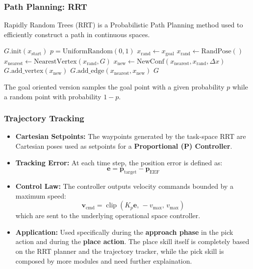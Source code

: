 \documentclass[10pt]{beamer}
\begin{document}
\begin{frame}[fragile]
    \frametitle{Path Planning: RRT}
    Rapidly Random Trees (RRT) is a Probabilistic Path Planning method used to efficiently construct a path in continuous spaces.
    \begin{algorithm}[H]
        \captionsetup{font=scriptsize}
        \scriptsize
        \caption{Goal Oriented RRT Algorithm}
        \begin{algorithmic}[1]
            \State $G.\text{init}(x_{\text{start}})$
                \State $p = \text{UniformRandom}(0, 1)$ 
                    \State $x_{\text{rand}} \gets x_{\text{goal}}$
                \Else
                    \State $x_{\text{rand}} \gets \text{RandPose}()$
                \EndIf
                \State $x_{\text{nearest}} \gets \text{NearestVertex}(x_{\text{rand}}, G)$
                \State $x_{\text{new}} \gets \text{NewConf}(x_{\text{nearest}}, x_{\text{rand}}, \Delta x)$
                    \State $G.\text{add\_vertex}(x_{\text{new}})$
                    \State $G.\text{add\_edge}(x_{\text{nearest}}, x_{\text{new}})$
                        \Return {}
                    \EndIf
                \EndIf
            \EndFor
            \State \Return $G$
        \end{algorithmic}
    \end{algorithm}
    The goal oriented version samples the goal point with a given probability $p$ while a random point with probability $1-p$. 
\end{frame}

\begin{frame}
    \frametitle{Trajectory Tracking}
    \begin{itemize}
        \item \textbf{Cartesian Setpoints:} 
        The waypoints generated by the task-space RRT are Cartesian poses used as setpoints for a \textbf{Proportional (P) Controller}.
        \item \textbf{Tracking Error:} 
        At each time step, the position error is defined as:
        \[
            \mathbf{e} = \mathbf{p}_{\text{target}} - \mathbf{p}_{\text{EEF}}
        \]
        \item \textbf{Control Law:} 
        The controller outputs velocity commands bounded by a maximum speed:
        \[
            \mathbf{v}_{\text{cmd}} = \operatorname{clip}(K_p \mathbf{e},\, -v_{\max},\, v_{\max})
        \]
        which are sent to the underlying operational space controller.
        \item \textbf{Application:} 
        Used specifically during the \textbf{approach phase} in the pick action and during the \textbf{place action}. The place skill itself is completely based on the RRT planner and the trajectory tracker, while the pick skill is composed by more modules and need further explaination.
    \end{itemize}
\end{frame}
\end{document}
